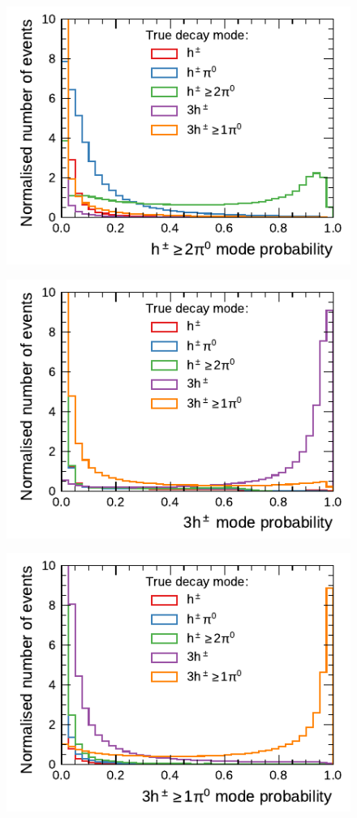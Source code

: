 \begin{minipage}{\textwidth}
\begin{subfigure}{0.48\textwidth}
  \end{subfigure}
  \begin{subfigure}{0.48\textwidth}
    \centering
    \includegraphics{./figures/decay_mode_classification/combined_proba/proba_1pXn.pdf}
  \end{subfigure}\hfill
  \begin{subfigure}{0.48\textwidth}
    \centering
    \includegraphics{./figures/decay_mode_classification/combined_proba/proba_3p0n.pdf}
  \end{subfigure}
  \begin{subfigure}{0.48\textwidth}
    \centering
    \includegraphics{./figures/decay_mode_classification/combined_proba/proba_3pXn.pdf}

\end{subfigure}
\end{minipage}
